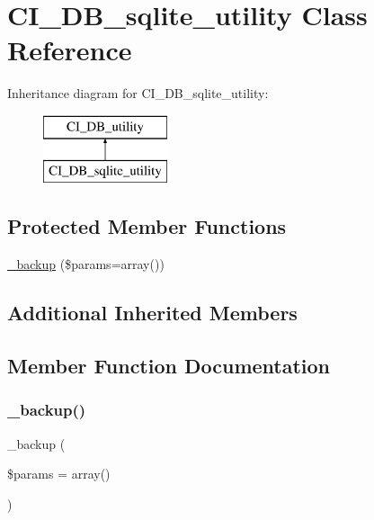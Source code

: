 \hypertarget{class_c_i___d_b__sqlite__utility}{}\section{C\+I\+\_\+\+D\+B\+\_\+sqlite\+\_\+utility Class Reference}
\label{class_c_i___d_b__sqlite__utility}
Inheritance diagram for C\+I\+\_\+\+D\+B\+\_\+sqlite\+\_\+utility\+:\begin{figure}[H]
\begin{center}
\leavevmode
\includegraphics[height=2.000000cm]{class_c_i___d_b__sqlite__utility}
\end{center}
\end{figure}
\subsection*{Protected Member Functions}
\begin{DoxyCompactItemize}
\item 
\mbox{\hyperlink{class_c_i___d_b__sqlite__utility_a30f3053d2c82e7562349924363507afa}{\+\_\+backup}} (\$params=array())
\end{DoxyCompactItemize}
\subsection*{Additional Inherited Members}


\subsection{Member Function Documentation}
\mbox{\label{class_c_i___d_b__sqlite__utility_a30f3053d2c82e7562349924363507afa}} 
\subsubsection{\texorpdfstring{\+\_\+backup()}{\_backup()}}
{\footnotesize\ttfamily \+\_\+backup (\begin{DoxyParamCaption}\item[{}]{\$params = {\ttfamily array()} }\end{DoxyParamCaption})\hspace{0.3cm}{\ttfamily [protected]}}

